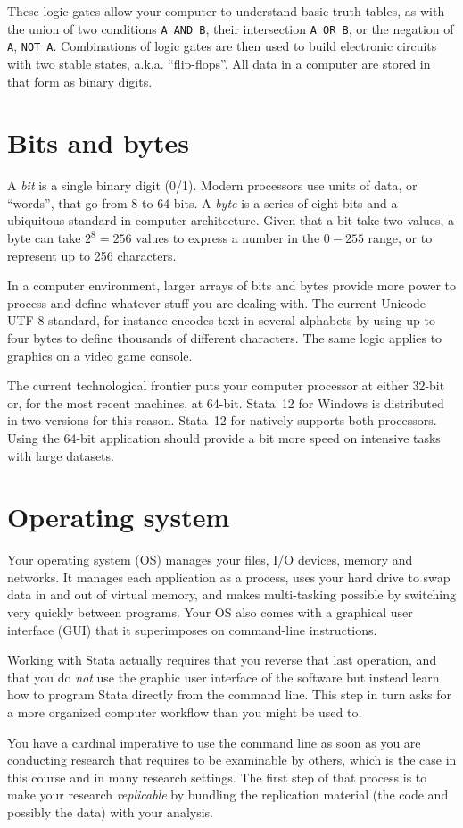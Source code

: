 These logic gates allow your computer to understand basic truth tables, as with the union of two conditions \texttt{A AND B}, their intersection \texttt{A OR B}, or the negation of \texttt{A}, \texttt{NOT A}. Combinations of logic gates are then used to build electronic circuits with two stable states, a.k.a. ``flip-flops''. All data in a computer are stored in that form as binary digits.%

%
\section*{Bits and bytes}%
%
A \emph{bit} is a single binary digit (0/1). Modern processors use units of data, or ``words'', that go from 8 to 64 bits. A \emph{byte} is a series of eight bits and a ubiquitous standard in computer architecture. Given that a bit take two values, a byte can take $2^8=256$ values to express a number in the $0-255$ range, or to represent up to 256 characters.%

In a computer environment, larger arrays of bits and bytes provide more power to process and define whatever stuff you are dealing with. The current Unicode UTF-8 standard, for instance encodes text in several alphabets by using up to four bytes to define thousands of different characters. The same logic applies to graphics on a video game console.%

The current technological frontier puts your computer processor at either 32-bit or, for the most recent machines, at 64-bit. Stata~12 for Windows is distributed in two versions for this reason. Stata~12 for \OSX natively supports both processors. Using the 64-bit application should provide a bit more speed on intensive tasks with large datasets.%

%
\section*{Operating system}%
%
Your operating system (OS) manages your files, I/O devices, memory and networks. It manages each application as a process, uses your hard drive to swap data in and out of virtual memory, and makes multi-tasking possible by switching very quickly between programs. Your OS also comes with a graphical user interface (GUI) that it superimposes on command-line instructions.%

Working with Stata actually requires that you reverse that last operation, and that you do \emph{not} use the graphic user interface of the software but instead learn how to program Stata directly from the command line. This step in turn asks for a more organized computer workflow than you might be used to.%

You have a cardinal imperative to use the command line as soon as you are conducting research that requires to be examinable by others, which is the case in this course and in many research settings. The first step of that process is to make your research \emph{replicable} by bundling the replication material (the code and possibly the data) with your analysis.%

%
%